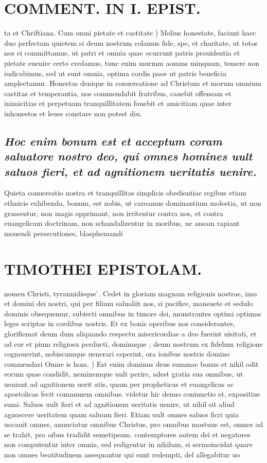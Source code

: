 \documentclass{article}
\begin{document}
\begin{pages}
\section*{COMMENT. IN I. EPIST. }
\marginpar{[ p.46 ]}\pstart ta et Chriftiana.  \pend\pstart Cum omni pietate et castitate ) Melius honestate, faciunt haec duo perfectam quietem si deum nostrum colamus fide, spe, et charitate, ut totos nos ei committamus, ut patri et omnia quae ocurrunt patris prouidentia et pietate euenire certo credamus, tunc enim murmm aomms minquam, temere non iudicabimus, sed ut sunt omnia, optima cordis paoe ut patris beneficia amplectamur.  \pend\pstart Honestas denique in conuersatione ad Christum et morum omnium castitas et temperantia, nos commendabit fratribus, cauebit offensam et inimicitias et perpetuam tranquillitatem fouebit et amicitiam quae inter inhonestos et leues constare non potest diu.  \pend
{}
{}
\subsection*{\textit{Hoc enim bonum est et acceptum coram saluatore nostro deo, qui omnes homines uult saluos fieri, et ad agnitionem ueritatis uenire. }}\pstart Quieta conuersatio nostra et tranquillitas simplicis obedientiae regibus etiam ethnicis exhibenda, bonum, est nobis, ut careamus dominantium molestia, ut non grassentur, non magis opprimant, non irritentur contra nos, et contra euangelicam doctrinam, non schandalizentur in moribus, ne ansam rapiant mouendi persecutiones, blasphemandi  \pend
\section*{TIMOTHEI EPISTOLAM. }
\marginpar{[ p.47 ]}\pstart nomen Christi, tyrannidisque ́.  \pend\pstart Cedet in gloriam magnam religionis nostrae, imo et domini dei nostri, qui per filium salualiit nos, si pacifice, mansuete et sedulo dominis obsequemur, subiecti omnibus in timore dei, monstrantes optimi optimas leges scriptas in cordibus nostris. Et ex bonis operibus nos considerantes, glorifiemat deum dum aliquando respectu misericordiae a deo fuerint uisitati, et ad cor et pium religiosu perducti, dominuque ; deum nostrum ex fidelum religione cognouerint, nobiscumque uenerari ceperint, ora ionibus nostris domino commendari  \pend\pstart Omne is hom. ) Est enim dominus deus summae bonus et nihil odit eorum quae condidit, neminemque uult perire, adest gratia sua omnibus, ut ueniant ad agnitionem uerit atis, quam per propheticas et euangelicas ac apostolicas fecit communem omnibus. videtur hic denuo coniunctio et, expositiue sumi. Saluos uult fieri et ad agnitionem ueritatis uenire, ut nihil sit aliud agnoscere ueritatem quam saluum fieri. Etiam uult omnes saluos ficri quia uocauit omnes, anunciatur omnibus Christus, pro omnibus mostuus est, omnes ad se trahit, pro oibus tradidit semetipsum. contemptores autem dei et negatores non computentur inter omnia, sed redigentur in nihilum, si sermoincidat quare non omnes beatitudinem assequantur qui sunt redempti, del allegabitur uo\pend

\end{pages}
\end{document}
